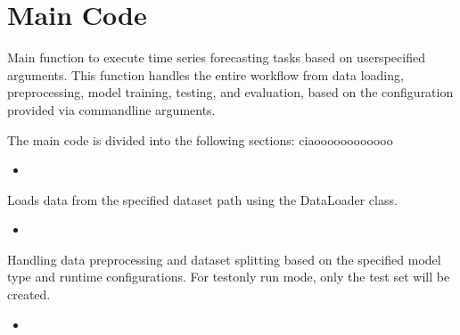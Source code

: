 \documentclass[letterpaper,10pt,english]{sphinxmanual}
\begin{document}
\sphinxstepscope


\section{Main Code}
\label{\detokenize{docs/main_code:module-main_code}}\label{\detokenize{docs/main_code:main-code}}\label{\detokenize{docs/main_code::doc}}

\begin{fulllineitems}
\label{\detokenize{docs/main_code:main_code.main}}
\pysigstartsignatures
{}
\pysigstopsignatures
\sphinxAtStartPar
Main function to execute time series forecasting tasks based on user\sphinxhyphen{}specified arguments.
This function handles the entire workflow from data loading, preprocessing, model training, testing,
and evaluation, based on the configuration provided via command\sphinxhyphen{}line arguments.

\end{fulllineitems}


\sphinxAtStartPar
The main code is divided into the following sections: ciaoooooooooooo
\begin{itemize}
\item {} 
\sphinxAtStartPar
{}

\end{itemize}

\sphinxAtStartPar
Loads data from the specified dataset path using the DataLoader class.
\begin{itemize}
\item {} 
\sphinxAtStartPar
{}

\end{itemize}

\sphinxAtStartPar
Handling data preprocessing and dataset splitting based on the specified model type and runtime configurations.
For test\sphinxhyphen{}only run mode, only the test set will be created.
\begin{itemize}
\item {} 
\sphinxAtStartPar
{}

\end{itemize}
\end{document}
